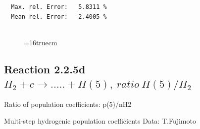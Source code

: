 \documentclass[12pt,dvips]{article}
\begin{document}
\begin{small}
\begin{verbatim}
  Max. rel. Error:   5.8311 %
  Mean rel. Error:   2.4005 %


\end{verbatim}\end{small}
\begin{figure} \label{2.2.5c}
\epsfxsize=16truecm
\end{figure}
\newpage
\subsection{
Reaction 2.2.5d  $H_2 + e \rightarrow .....+H(5)   , \  ratio ~ H(5)/H_2 $
}

 Ratio of population coefficients: p(5)/nH2

 Multi-step hydrogenic population coefficients
 Data: T.Fujimoto
\end{document}
